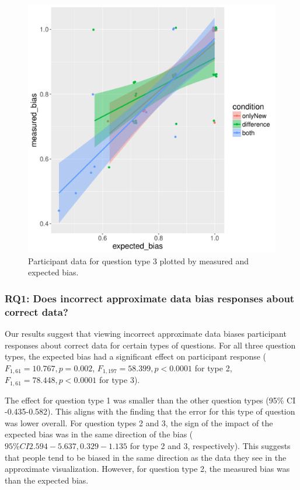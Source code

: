 \documentclass[10pt,journal,compsoc]{IEEEtran}
\begin{document}
\begin{figure}[!t]
  \centering
  \includegraphics[width=\columnwidth]{jaccard_precise_jitter.pdf}
  \caption{Participant data for question type 3 plotted by measured and expected bias.}
  \label{figure_q3}
\end{figure}

\subsubsection{RQ1: Does incorrect approximate data bias responses about correct data?}

Our results suggest that viewing incorrect approximate data biases participant responses about correct data for certain types of questions.
For all three question types, the expected bias had a significant effect on participant response ($F_{1,61}=10.767, p=0.002$, $F_{1, 197}=58.399, p<0.0001$ for type 2, $F_{1, 61}=78.448, p<0.0001$ for type 3).

The effect for question type 1 was smaller than the other question types (95\% CI -0.435-0.582).
This aligns with the finding that the error for this type of question was lower overall.
For question types 2 and 3, the sign of the impact of the expected bias was in the same direction of the bias ($95\% CI 2.594-5.637, 0.329-1.135$ for type 2 and 3, respectively).
This suggests that people tend to be biased in the same direction as the data they see in the approximate visualization.
However, for question type 2, the measured bias was  than the expected bias.
\end{document}
